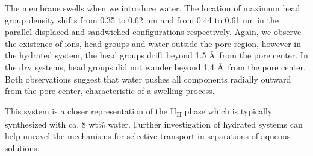 \documentclass{article}
\begin{document}
  The membrane swells when we introduce water. The location of maximum head
  group density shifts from 0.35 to 0.62 nm and from 0.44 to 0.61 nm in the
  parallel displaced and sandwiched configurations respectively. Again, we
  observe the existence of ions, head groups and water outside the pore region,
  however in the hydrated system, the head groups drift beyond 1.5 \AA~from the
  pore center. In the dry systems, head groups did not wander beyond 1.4 \AA~from
  the pore center. Both observations suggest that water pushes all components
  radially outward from the pore center, characteristic of a swelling process. 
   
  This system is a closer representation of the H\textsubscript{II} phase which
  is typically synthesized with ca. 8 wt\% water. Further investigation of
  hydrated systems can help unravel the mechanisms for selective transport in
  separations of aqueous solutions. 
\end{document}
